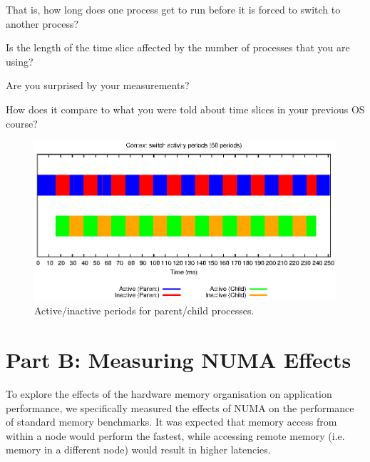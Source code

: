\documentclass[11pt,twoside]{article}
\begin{document}
That is, how long does one process get to run before it is forced to switch to another process? 

Is the length of the time slice affected by the number of processes that you are using? 

Are you surprised by your measurements? 

How does it compare to what you were told about time slices in your previous OS course?

\begin{figure}
    \centering
    \includegraphics[width=\textwidth]{parta_context}
    \caption{Active/inactive periods for parent/child processes.}
    \label{fig:context}
\end{figure}


\section{Part B: Measuring NUMA Effects}
To explore the effects of the hardware memory organisation on application performance, we specifically measured the effects of NUMA on the performance of standard memory benchmarks. It was expected that memory access from within a node would perform the fastest, while accessing remote memory (i.e. memory in a different node) would result in higher latencies.
\end{document}
